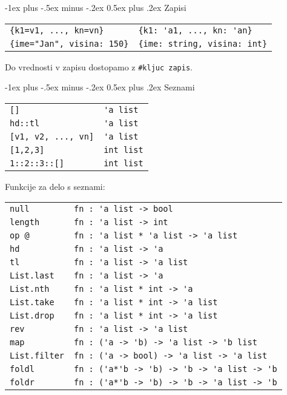 \documentclass[a3paper,9pt]{extarticle}
\makeatletter
\renewcommand{\section}{\@startsection{section}{1}{0mm}%
                                {-1ex plus -.5ex minus -.2ex}%
                                {0.5ex plus .2ex}%
                                {\normalfont\large\bfseries}}
\makeatother
\begin{document}
\begin{multicols}{4}
\section{Zapisi}
\begin{tabular}{@{}ll@{}}
    \lstinline|{k1=v1, ..., kn=vn}| & \lstinline|{k1: 'a1, ..., kn: 'an}| \\
    \lstinline|{ime="Jan", visina: 150}| & \lstinline|{ime: string, visina: int}| \\
\end{tabular}

Do vrednosti v zapisu dostopamo z \lstinline|#kljuc zapis|.

\section{Seznami}
\begin{tabular}{@{}ll@{}}
    \lstinline|[]| & \lstinline|'a list|\\
    \lstinline|hd::tl| & \lstinline|'a list|\\
    \lstinline|[v1, v2, ..., vn]| & \lstinline|'a list|\\
    \lstinline|[1,2,3]| & \lstinline|int list| \\
    \lstinline|1::2::3::[]| & \lstinline|int list| \\
\end{tabular}

Funkcije za delo s seznami:

\begin{tabular}{@{}ll@{}}
    \lstinline|null| & \lstinline|fn : 'a list -> bool|\\
    \lstinline|length| & \lstinline|fn : 'a list -> int|\\
    \lstinline|op @| & \lstinline|fn : 'a list * 'a list -> 'a list|\\
    \lstinline|hd| & \lstinline|fn : 'a list -> 'a|\\
    \lstinline|tl| & \lstinline|fn : 'a list -> 'a list|\\
    \lstinline|List.last| & \lstinline|fn : 'a list -> 'a|\\
    \lstinline|List.nth| & \lstinline|fn : 'a list * int -> 'a|\\
    \lstinline|List.take| & \lstinline|fn : 'a list * int -> 'a list|\\
    \lstinline|List.drop| & \lstinline|fn : 'a list * int -> 'a list|\\
    \lstinline|rev| & \lstinline|fn : 'a list -> 'a list|\\
    \lstinline|map| & \lstinline|fn : ('a -> 'b) -> 'a list -> 'b list|\\
    \lstinline|List.filter| & \lstinline|fn : ('a -> bool) -> 'a list -> 'a list|\\
    \lstinline|foldl| & \lstinline|fn : ('a*'b -> 'b) -> 'b -> 'a list -> 'b|\\
    \lstinline|foldr| & \lstinline|fn : ('a*'b -> 'b) -> 'b -> 'a list -> 'b|\\
\end{tabular}


\end{multicols}
\end{document}
